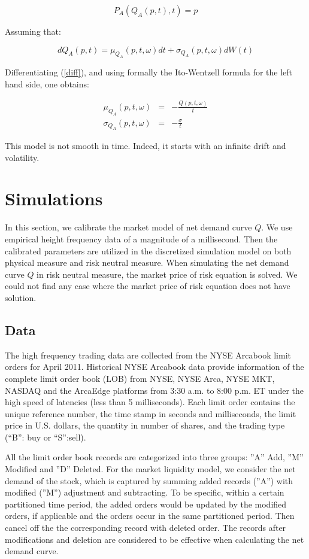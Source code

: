\documentclass{article}
\begin{document}
\begin{equation}
P_{A}(Q_{A}(p,t),t)=p  \label{diff}
\end{equation}

Assuming that:

\begin{equation*}
dQ_{A}(p,t)=\mu _{Q_{A}}(p,t,\omega )dt+\sigma _{Q_{A}}(p,t,\omega )dW(t)
\end{equation*}

Differentiating (\ref{diff}), and using formally the Ito-Wentzell formula
for the left hand side, one obtains:

\begin{eqnarray*}
\mu _{Q_{A}}(p,t,\omega ) &=&-\frac{Q(p,t,\omega )}{t} \\
\sigma _{Q_{A}}(p,t,\omega ) &=&-\frac{\sigma }{t}
\end{eqnarray*}

This model is not smooth in time. Indeed, it starts with an infinite drift
and volatility.

\section{Simulations}
In this section, we calibrate the market model of net demand curve $Q$. We use empirical height frequency data of a magnitude of a millisecond. Then the calibrated parameters are utilized in the discretized simulation model on both physical measure and risk neutral measure. When simulating the net demand curve $Q$ in risk neutral measure, the market price of risk equation is solved. We could not find any case where the market price of risk equation does not have solution.

\subsection{Data}
The high frequency trading data are collected from the NYSE Arcabook limit orders for April 2011.
Historical NYSE Arcabook data provide information of the complete limit order book (LOB) from NYSE, NYSE Arca, NYSE MKT, NASDAQ and the ArcaEdge platforms from 3:30 a.m. to 8:00 p.m. ET
under the high speed of latencies (less than 5 milliseconds). Each limit order contains the unique reference number, the time stamp in seconds and milliseconds, the limit
price in U.S. dollars, the quantity in number of shares, and the trading type (“B”: buy or “S”:sell).

All the limit order book records are categorized into three groups: ''A'' Add, ''M'' Modified and ''D'' Deleted.
For the market liquidity model, we consider the net demand of the stock, which is captured by summing added records (''A'') with modified (''M'') adjustment and subtracting.
To be specific, within a certain partitioned time period, the added orders would be updated by the modified orders, if applicable and the orders occur in the same partitioned period.
Then cancel off the the corresponding record with deleted order. The records after modifications and deletion are considered to be effective when calculating the net demand curve.
\end{document}
